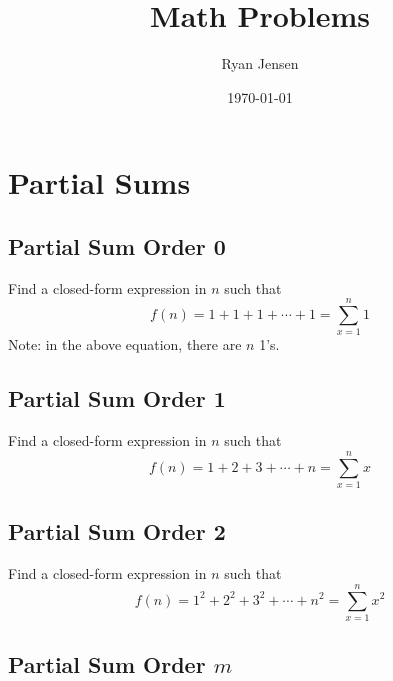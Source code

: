 \documentclass[letterpaper, 11pt]{report}
\numberwithin{equation}{section}
\begin{document}
	
	
	\author{Ryan Jensen}
	\title{Math Problems}
	\date{\today}
	\maketitle
	
	
	
	\tableofcontents
	
	
	
	
	
	
	\chapter{Partial Sums}
		
		
		
		\section{Partial Sum Order 0}
			
			
			Find a closed-form expression in $ n $ such that
			\begin{equation}
				f(n) = 1 + 1 + 1 + \cdots + 1 = \sum_{x=1}^{n} 1
			\end{equation}
			Note: in the above equation, there are $n$ 1's.
			
			
		\section{Partial Sum Order 1}
			
			
			Find a closed-form expression in $ n $ such that
			\begin{equation}
				f(n) = 1 + 2 + 3 + \cdots + n = \sum_{x=1}^{n} x
			\end{equation}
			
			
		\section{Partial Sum Order 2}
			
			
			Find a closed-form expression in $ n $ such that
			\begin{equation}
				f(n) = 1^2 + 2^2 + 3^2 + \cdots + n^2 = \sum_{x=1}^{n} x^2
			\end{equation}
			
			
		\section{Partial Sum Order $m$}
			
\end{document}

